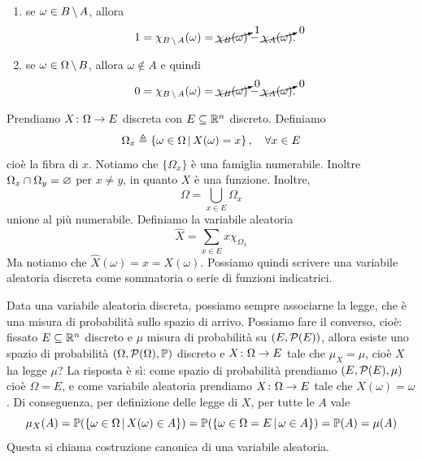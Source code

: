 \documentclass[a4paper]{article}
\begin{document}
\begin{snippetproof}{}
\begin{enumerate}
\begin{enumerate}
                \item se \(\omega \in B \,\backslash\, A\), allora
                    \begin{align*}
                        1 &= \chi_{B \,\backslash\, A}(\omega)
                        = \cancelto{1}{\chi_B(\omega)}
                        - \cancelto{0}{\chi_A(\omega)}.
                    \end{align*}

                \item se \(\omega \in \Omega \,\backslash\, B\), allora \(\omega \notin A\) e quindi
                    \begin{align*}
                        0 &= \chi_{B \,\backslash\, A}(\omega)
                        = \cancelto{0}{\chi_B(\omega)}
                        - \cancelto{0}{\chi_A(\omega)}.
                    \end{align*}
            \end{enumerate}
    \end{enumerate}
\end{snippetproof}

Prendiamo \(X \colon \Omega \to E\) discreta con \(E \subseteq \mathbb{R}^n\)
discreto. Definiamo
\[
    \Omega_x \triangleq \left\{
        \omega \in \Omega \,|\, X(\omega) = x
    \right\}, \quad \forall x \in E
\]
cioè la fibra di \(x\).
Notiamo che \(\{\Omega_x\}\) è una famiglia numerabile.
Inoltre \(\Omega_x \cap \Omega_y = \varnothing\) per \(x \neq y\),
in quanto \(X\) è una funzione.
Inoltre,
\[
    \Omega = \bigcup_{x \in E} \Omega_x
\]
unione al più numerabile.
Definiamo la variabile aleatoria
\[
    \hat X = \sum_{x\in E} x \chi_{\Omega_x}
\]
Ma notiamo che \(\hat X(\omega) = x = X(\omega)\).
Possiamo quindi scrivere una variabile aleatoria discreta come sommatoria o serie
di funzioni indicatrici.

Data una variabile aleatoria discreta, possiamo sempre associarne la legge, che è una misura di probabilità
sullo spazio di arrivo. Possiamo fare il converso, cioè: fissato \(E \subseteq \mathbb{R}^n\)
discreto e \(\mu\) misura di probabilità su \((E, \mathcal P(E))\), allora esiste uno spazio
di probabilità \((\Omega, \mathcal P(\Omega), \mathbb P)\)
discreto e \(X \colon \Omega \to E\) tale che \(\mu_X = \mu\),
cioè \(X\) ha legge \(\mu\)?
La risposta è sì: come spazio di probabilità prendiamo \((E, \mathcal P(E), \mu)\)
cioè \(\Omega = E\),
e come variabile aleatoria prendiamo \(X \colon \Omega \to E\)
tale che \(X(\omega) = \omega\).
Di conseguenza, per definizione delle legge di \(X\), per tutte le \(A\) vale
\[
    \mu_X(A) = \mathbb P(\left\{
            \omega \in \Omega \,|\, X(\omega) \in A
    \right\})
    = \mathbb P(\left\{
            \omega \in \Omega = E \,|\, \omega \in A
    \right\}) = \mathbb P(A) = \mu(A)
\]
Questa si chiama costruzione canonica di una variabile aleatoria.
\end{document}
